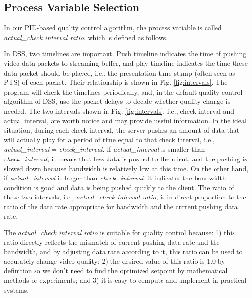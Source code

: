 \documentclass[journal]{IEEEtran}
\begin{document}
\subsection{Process Variable Selection}
\label{subsec:variable}

In our PID-based quality control algorithm, the process variable is called \textit{actual\_check interval ratio}, which is defined as follows.

In DSS, two timelines are important. Push timeline indicates the time of pushing video data packets to streaming buffer, and play timeline indicates the time these data packet should be played, i.e., the presentation time stamp (often seen as PTS) of each packet. Their relationship is shown in Fig. \ref{fig:intervals}. The program will check the timelines periodically, and, in the default quality control algorithm of DSS, use the packet delays to decide whether quality change is needed. The two intervals shown in Fig. \ref{fig:intervals}, i.e., check interval and actual interval, are worth notice and may provide useful information. In the ideal situation, during each check interval, the server pushes an amount of data that will actually play for a period of time equal to that check interval, i.e., \textit{actual\_interval} = \textit{check\_interval}. If \textit{actual\_interval} is smaller than \textit{check\_interval}, it means that less data is pushed to the client, and the pushing is slowed down because bandwidth is relatively low at this time. On the other hand, if \textit{actual\_interval} is larger than \textit{check\_interval}, it indicates the bandwidth condition is good and data is being pushed quickly to the client. The ratio of these two intervals, i.e., \textit{actual\_check interval ratio}, is in direct proportion to the ratio of the data rate appropriate for bandwidth and the current pushing data rate.

The \textit{actual\_check interval ratio} is suitable for quality control because: 1) this ratio directly reflects the mismatch of current pushing data rate and the bandwidth, and by adjusting data rate according to it, this ratio can be used to accurately change video quality; 2) the desired value of this ratio is 1.0 by definition so we don't need to find the optimized setpoint by mathematical methods or experiments; and 3) it is easy to compute and implement in practical systems.
\end{document}

